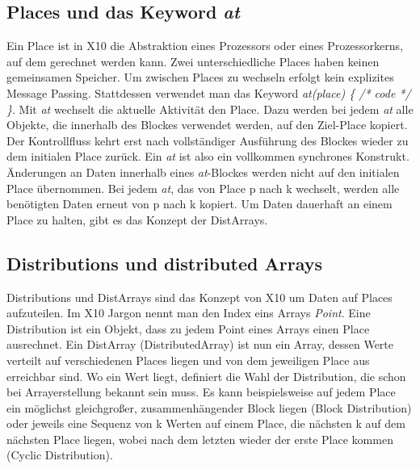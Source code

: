 \subsection{Places und das Keyword \textit{at}} %
\label{sub:places_und_das_keyword_at}
Ein Place ist in X10 die Abstraktion eines Prozessors oder eines Prozessorkerns, auf dem gerechnet werden kann. Zwei unterschiedliche Places haben keinen gemeinsamen Speicher. Um zwischen Places zu wechseln erfolgt kein explizites Message Passing. Stattdessen verwendet man das Keyword \textit{at(place) \{ /* code */ \}}. Mit \textit{at} wechselt die aktuelle Aktivität den Place. Dazu werden bei jedem \textit{at} alle Objekte, die innerhalb des Blockes verwendet werden, auf den Ziel-Place kopiert. Der Kontrollfluss kehrt erst nach vollständiger Ausführung des Blockes wieder zu dem initialen Place zurück. Ein \textit{at} ist also ein vollkommen synchrones Konstrukt. Änderungen an Daten innerhalb eines \textit{at}-Blockes werden nicht auf den initialen Place übernommen. Bei jedem \textit{at}, das von Place p nach k wechselt, werden alle benötigten Daten erneut von p nach k kopiert. Um Daten dauerhaft an einem Place zu halten, gibt es das Konzept der DistArrays.\cite{x10Spec:2012:Online}

\subsection{Distributions und distributed Arrays} %
\label{sub:distributions_und_distributed_arrays}
Distributions und DistArrays sind das Konzept von X10 um Daten auf Places aufzuteilen. Im X10 Jargon nennt man den Index eins Arrays \textit{Point}. Eine Distribution ist ein Objekt, dass zu jedem Point eines Arrays einen Place ausrechnet. Ein DistArray (DistributedArray) ist nun ein Array, dessen Werte verteilt auf verschiedenen Places liegen und von dem jeweiligen Place aus erreichbar sind. Wo ein Wert liegt, definiert die Wahl der Distribution, die schon bei Arrayerstellung bekannt sein muss. Es kann beispielsweise auf jedem Place ein möglichst gleichgroßer, zusammenhängender Block liegen (Block Distribution) oder jeweils eine Sequenz von k Werten auf einem Place, die nächsten k auf dem nächsten Place liegen, wobei nach dem letzten wieder der erste Place kommen (Cyclic Distribution).\cite{x10Spec:2012:Online}


